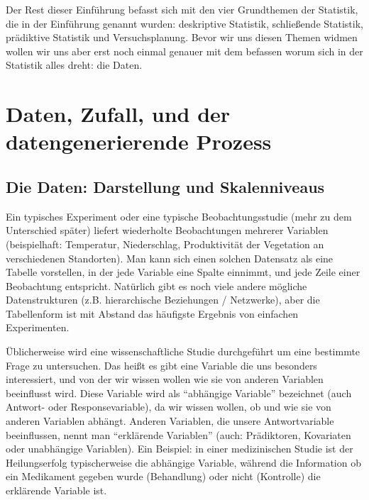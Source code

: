 \documentclass[a4paper,twoside]{tufte-book}\usepackage[]{graphicx}\usepackage[]{color}
\begin{document}
Der Rest dieser Einführung befasst sich mit den vier Grundthemen der Statistik, die in der Einführung genannt wurden: deskriptive Statistik, schließende Statistik, prädiktive Statistik und Versuchsplanung. Bevor wir uns diesen Themen widmen wollen wir uns aber erst noch einmal genauer mit dem befassen worum sich in der Statistik alles dreht: die Daten.
	
	\chapter{Daten, Zufall, und der datengenerierende Prozess}
	
		\section{Die Daten: Darstellung und Skalenniveaus}
	
	Ein typisches Experiment oder eine typische Beobachtungsstudie (mehr zu dem Unterschied später) liefert wiederholte Beobachtungen mehrerer Variablen (beispielhaft: Temperatur, Niederschlag, Produktivität der Vegetation an verschiedenen Standorten). Man kann sich einen solchen Datensatz als eine Tabelle vorstellen, in der jede Variable eine Spalte einnimmt, und jede Zeile einer Beobachtung entspricht. Natürlich gibt es noch viele andere mögliche Datenstrukturen (z.B. hierarchische Beziehungen / Netzwerke), aber die Tabellenform ist mit Abstand das häufigste Ergebnis von einfachen Experimenten.
	
Üblicherweise wird eine wissenschaftliche Studie durchgeführt um eine bestimmte Frage zu untersuchen. Das heißt es gibt eine Variable die uns besonders interessiert, und von der wir wissen wollen wie sie von anderen Variablen beeinflusst wird.   Diese Variable wird als ``abhängige Variable'' bezeichnet (auch Antwort- oder Responsevariable), da wir wissen wollen, ob und wie sie von anderen Variablen abhängt. Anderen Variablen, die unsere Antwortvariable beeinflussen, nennt man "`erklärende Variablen"' (auch: Prädiktoren, Kovariaten oder unabhängige Variablen). Ein Beispiel: in einer medizinischen Studie ist der Heilungserfolg typischerweise die abhängige Variable, während die Information ob ein Medikament gegeben wurde (Behandlung) oder nicht (Kontrolle) die erklärende Variable ist. 
\end{document}
